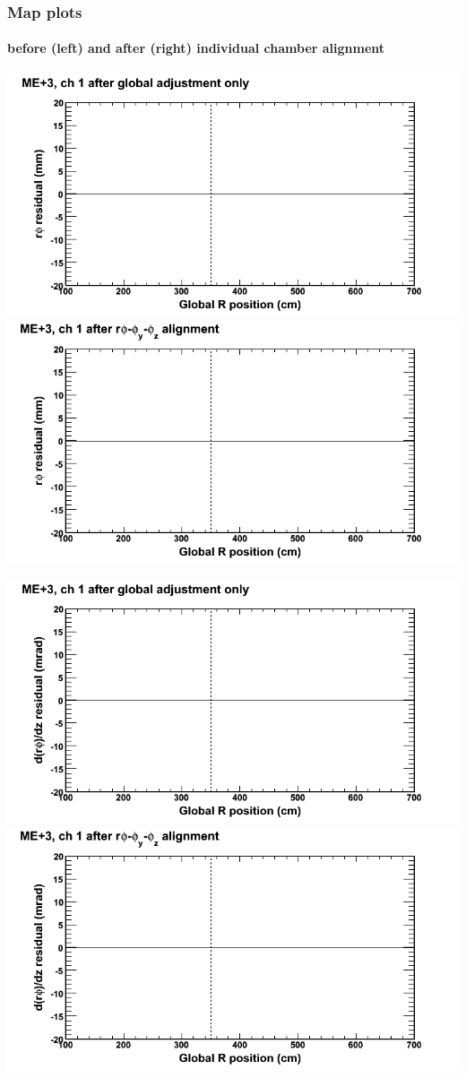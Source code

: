 \documentclass[compress]{beamer}
\begin{document}
\begin{frame}
\frametitle{Map plots}
\framesubtitle{before (left) and after (right) individual chamber alignment}
\includegraphics[width=0.5\linewidth]{ringmapplots_3dof/before_CSCvsr_mep3ch01_x.png} \includegraphics[width=0.5\linewidth]{ringmapplots_3dof/after_CSCvsr_mep3ch01_x.png}

\includegraphics[width=0.5\linewidth]{ringmapplots_3dof/before_CSCvsr_mep3ch01_dxdz.png} \includegraphics[width=0.5\linewidth]{ringmapplots_3dof/after_CSCvsr_mep3ch01_dxdz.png}
\end{frame}
\end{document}
